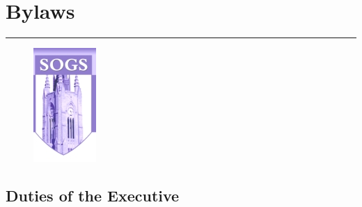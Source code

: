 \chapter{Bylaws}

\rule{\textwidth}{0.5pt}\vspace*{-\baselineskip}\vspace{3.2pt} %
\begin{figure}
\centering
\includegraphics{logo.jpg}\\[1cm]
\end{figure}

\newpage


\section {Duties of the Executive}
